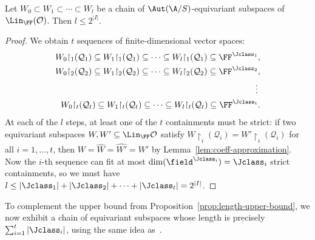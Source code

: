 \begin{proposition}\label{prop:length-upper-bound}
    Let $W_0 \subset W_1 \subset \cdots \subset W_l$ be a chain of $\Aut(\A/S)$-equivariant subspaces of $\Lin_\FF(\mathcal{O})$.
    Then $l \leq 2^{|I|}$. 
\end{proposition}
\begin{proof}
    We obtain $t$ sequences of finite-dimensional vector spaces:
    \begin{align*}
        W_0 {\restriction_1} (\mathcal{Q}_1) \subseteq W_1 {\restriction_1} (\mathcal{Q}_1) \subseteq \cdots \subseteq W_l {\restriction_1} (\mathcal{Q}_1) \subseteq \FF^{\Jclass_1}, \\
        W_0 {\restriction_2} (\mathcal{Q}_2) \subseteq W_1 {\restriction_2} (\mathcal{Q}_2) \subseteq \cdots \subseteq W_l {\restriction_2} (\mathcal{Q}_2) \subseteq \FF^{\Jclass_2}, \\
        \vdots\phantom{,}\\
        W_0 {\restriction_t} (\mathcal{Q}_t) \subseteq W_1 {\restriction_t} (\mathcal{Q}_t) \subseteq \cdots \subseteq W_l {\restriction_t} (\mathcal{Q}_t) \subseteq \FF^{\Jclass_t}.
    \end{align*}
    At each of the $l$ steps, at least one of the $t$ containments must be strict:
    if two equivariant subspaces $W, W' \subseteq \Lin_\FF \cal O$ satisfy $W {\restriction_i}(\mathcal{Q}_i) = W' {\restriction_i}(\mathcal{Q}_i)$ for all $i=1,\ldots, t$,
    then $W = \widehat W = \widehat{W'} = W'$ by Lemma~\ref{lem:coeff-approximation}.
    Now the $i$-th sequence can fit at most $\dim(\field^{\Jclass_i}) = \Jclass_i$ strict containments,
    so we must have $l \leq |\Jclass_1| + |\Jclass_2| + \dots + |\Jclass_t| = 2^{|I|}$. 
\end{proof}

To complement the upper bound from Proposition~\ref{prop:length-upper-bound}, we now exhibit a chain of equivariant subspaces whose length is precisely $\sum_{i=1}^t |\Jclass_i|$, using the same idea as~\cite[Cor.~4.12]{BFKM24}.

